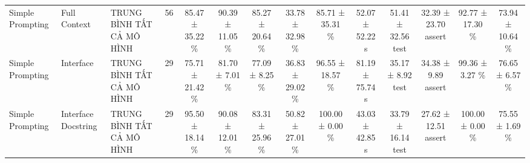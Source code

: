 \begin{table}[htbp]
\begin{tabular}{lllccccccccccc}
Simple Prompting & Full Context & TRUNG BÌNH TẤT CẢ MÔ HÌNH & 56 & 85.47 ± 35.22 \% & 90.39 ± 11.05 \% & 85.27 ± 20.64 \% & 33.78 ± 32.98 \% & 85.71 ± 35.31 \% & 52.07 ± 52.22 s & 51.41 ± 32.56 test & 32.39 ± 23.70 assert & 92.77 ± 17.30 \% & 73.94 ± 10.64 \% \\
Simple Prompting & Interface & TRUNG BÌNH TẤT CẢ MÔ HÌNH & 29 & 75.71 ± 21.42 \% & 81.70 ± 7.01 \% & 77.09 ± 8.25 \% & 36.83 ± 29.02 \% & 96.55 ± 18.57 \% & 81.19 ± 75.74 s & 35.17 ± 8.92 test & 34.38 ± 9.89 assert & 99.36 ± 3.27 \% & 76.65 ± 6.57 \% \\
Simple Prompting & Interface Docstring & TRUNG BÌNH TẤT CẢ MÔ HÌNH & 29 & 95.50 ± 18.14 \% & 90.08 ± 12.01 \% & 83.31 ± 25.96 \% & 50.82 ± 27.01 \% & 100.00 ± 0.00 \% & 43.03 ± 42.85 s & 33.79 ± 16.14 test & 27.62 ± 12.51 assert & 100.00 ± 0.00 \% & 75.55 ± 1.69 \% \\
\bottomrule
\end{tabular}
\end{table}